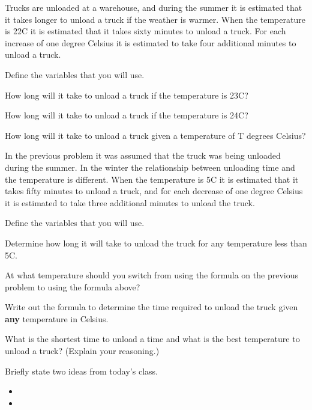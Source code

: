 \begin{problem}
\item Trucks are unloaded at a warehouse, and during the summer it is
  estimated that it takes longer to unload a truck if the weather is
  warmer. When the temperature is 22C it is estimated that it takes
  sixty minutes to unload a truck. For each increase of one degree
  Celsius it is estimated to take four additional minutes to unload a
  truck.
  \begin{subproblem}
  \item Define the variables that you will use.
    \vspace{2em}
  \item How long will it take to unload a truck if the temperature
    is 23C?
    \vspace{2em}
  \item How long will it take to unload a truck if the temperature
    is 24C?
    \vspace{2em}
  \item How long will it take to unload a truck given a temperature
    of T degrees Celsius?
    \vfill
  \end{subproblem}

  \clearpage

\item In the previous problem it was assumed that the truck was being
  unloaded during the summer. In the winter the relationship between
  unloading time and the temperature is different. When the
  temperature is 5C it is estimated that it takes fifty minutes to
  unload a truck, and for each decrease of one degree Celsius it is
  estimated to take three additional minutes to unload the truck.
  \begin{subproblem}
  \item Define the variables that you will use.
    \vspace{2em}
  \item Determine how long it will take to unload the truck for any
    temperature less than 5C.
    \vfill
  \item At what temperature should you switch from using the
    formula on the previous problem to using the formula above?
    \vfill
    \vfill
  \item Write out the formula to determine the time required to
    unload the truck given \textbf{any} temperature in Celsius.
    \vspace{3em}
  \item What is the shortest time to unload a time and what is the
    best temperature to unload a truck?  (Explain your reasoning.)
    \vspace{2em}
  \end{subproblem}

\end{problem}

\postClass

\begin{problem}
\item Briefly state two ideas from today's class.
  \begin{itemize}
  \item 
  \item 
  \end{itemize}
\item 
  \begin{subproblem}
    \item
  \end{subproblem}
\end{problem}

